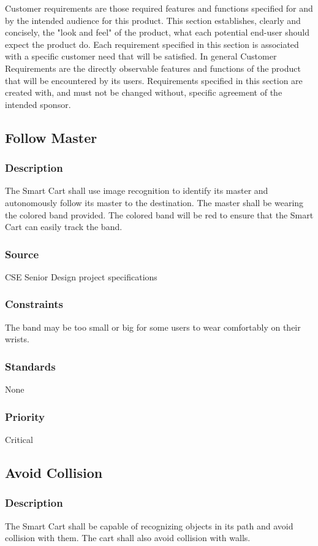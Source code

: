 Customer requirements are those required features and functions specified for and by the intended audience for this product. This section establishes, clearly and concisely, the "look and feel" of the product, what each potential end-user should expect the product do. Each requirement specified in this section is associated with a specific customer need that will be satisfied. In general Customer Requirements are the directly observable features and functions of the product that will be encountered by its users. Requirements specified in this section are created with, and must not be changed without, specific agreement of the intended sponsor.

\subsection{Follow Master}
\subsubsection{Description}
The Smart Cart shall use image recognition to identify its master and autonomously follow its master to the destination. The master shall be wearing the colored band provided. The colored band will be red to ensure that the Smart Cart can easily track the band.
\subsubsection{Source}
CSE Senior Design project specifications
\subsubsection{Constraints}
The band may be too small or big for some users to wear comfortably on their wrists. 
\subsubsection{Standards}
None
\subsubsection{Priority}
Critical

\subsection{Avoid Collision}
\subsubsection{Description}
The Smart Cart shall be capable of recognizing objects in its path and avoid collision with them. The cart shall also avoid collision with walls.
